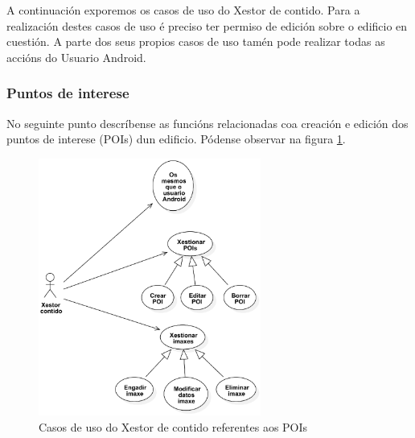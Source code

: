A continuación exporemos os casos de uso do Xestor de contido. Para a realización destes casos de uso é preciso ter permiso de edición sobre o edificio en cuestión. A parte dos seus propios casos de uso tamén pode realizar todas as accións do Usuario Android.

\subsubsection{Puntos de interese}
No seguinte punto descríbense as funcións relacionadas coa creación e edición dos puntos de interese (POIs) dun edificio. Pódense observar na figura \ref{fig:cuXestorContidoPOI}.

\begin{figure}[tbp]
	\begin{center}
		\includegraphics[width=0.65\textwidth]{figures/CasosUso/XestorContidoPoi}
		\caption{Casos de uso do Xestor de contido referentes aos POIs}
		\label{fig:cuXestorContidoPOI}
	\end{center}
\end{figure}

